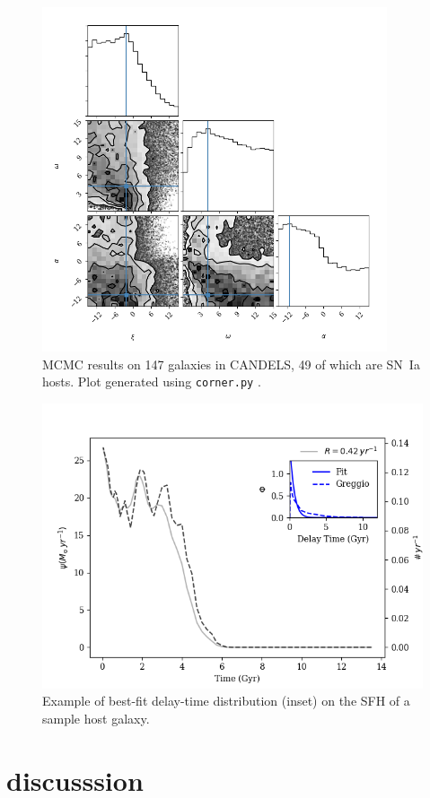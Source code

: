 \documentclass[apj]{aastex}
\begin{document}
\begin{figure}[t] %
   \centering
   \includegraphics[width=4in]{Figure_1} 
   \caption{\footnotesize MCMC results on 147 galaxies in CANDELS, 49 of which are SN~Ia hosts. Plot generated using {\tt corner.py} \citep{Foreman-Mackey:2016ve}.}
   \label{fig:fg1}
\end{figure}
\begin{figure}[h] %
   \centering
   \includegraphics[width=4.5in]{Figure_2} 
   \caption{\footnotesize Example of best-fit delay-time distribution (inset) on the SFH of a sample host galaxy. }
   \label{fig:fg2}
\end{figure}

\section{discusssion}

{}
\end{document}
